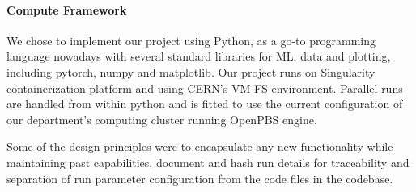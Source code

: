 \documentclass[paper/ddppaper2.tex]{subfiles}
\begin{document}
\paragraph{Compute Framework}

We chose to implement our project using Python, as a go-to programming language nowadays with several standard libraries for ML, data and plotting, including pytorch, numpy and matplotlib. Our project runs on Singularity containerization platform and using CERN's VM FS environment. Parallel runs are handled from within python and is fitted to use the current configuration of our department's computing cluster running OpenPBS engine.

Some of the design principles were to encapsulate any new functionality while maintaining past capabilities, document and hash run details for traceability and separation of run parameter configuration from the code files in the codebase.
\end{document}
